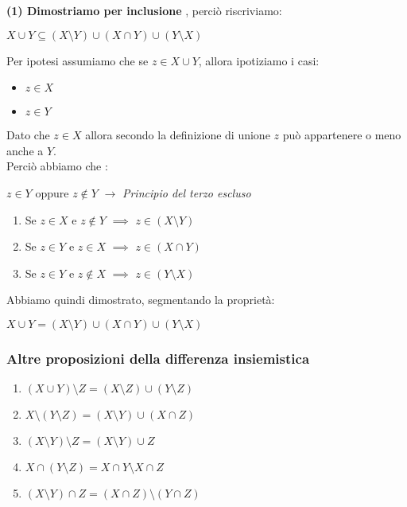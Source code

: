 \documentclass[article,12pt]{book}
\begin{document}
\begin{enumerate}
\textbf{(1) Dimostriamo per inclusione }, perciò riscriviamo:
    \begin{center}
        \(X \cup Y \subseteq (X \setminus Y) \cup (X \cap Y) \cup (Y \setminus X)\)
    \end{center}
Per ipotesi assumiamo che se $z \in X \cup Y$, allora ipotiziamo i casi:
\begin{itemize}
    \item $z \in X$
    \item $z \in Y$
\end{itemize}
Dato che $z \in X$ allora secondo la definizione di unione $z$ può appartenere o meno anche a $Y$. \\
Perciò abbiamo che :
\begin{center}
    $z \in Y$ oppure $z \notin Y$ $\rightarrow$ \textit{Principio del terzo escluso}
\end{center}

\begin{enumerate}
    \item Se $z \in X$ e $z \notin Y$ $\implies$ $z \in (X \setminus Y)$
    \item Se $z \in Y$ e $z \in X$ $\implies$ $z \in (X \cap Y)$
    \item Se $z \in Y$ e $z \notin X$ $\implies$ $z \in (Y \setminus X)$
\end{enumerate}

Abbiamo quindi dimostrato, segmentando la proprietà: 
    \begin{center}
        \(X \cup Y = (X \setminus Y) \cup (X \cap Y) \cup (Y \setminus X)\)
    \end{center}

\newpage
\subsubsection{Altre proposizioni della differenza insiemistica}
    \begin{enumerate}
        \item $(X \cup Y) \setminus Z = (X \setminus Z) \cup (Y \setminus Z)$
        \item $X \setminus (Y \setminus Z) = (X \setminus Y) \cup (X \cap Z)$
        \item $(X \setminus Y) \setminus Z = (X \setminus Y) \cup Z$
        \item $X \cap (Y \setminus Z) = X \cap Y \setminus X \cap Z$
        \item $(X \setminus Y) \cap Z = (X \cap Z) \setminus (Y \cap Z)$
    \end{enumerate}


\end{enumerate}
\end{document}
